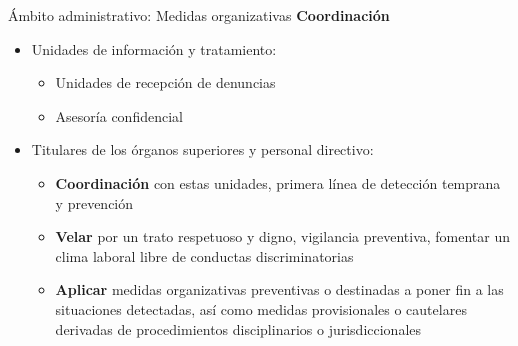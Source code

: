 \documentclass{beamer}
\begin{document}
    \begin{frame}{Ámbito administrativo: Medidas organizativas}
        \textbf{Coordinación}
        \begin{itemize}
            \item Unidades de información y tratamiento:
            \begin{itemize}
                \item Unidades de recepción de denuncias
                \item Asesoría confidencial
            \end{itemize}
            \item Titulares de los órganos superiores y personal directivo:
            \begin{itemize}
                \item \textbf{Coordinación} con estas unidades, primera línea de detección temprana y prevención
                \item \textbf{Velar} por un trato respetuoso y digno, vigilancia preventiva, fomentar un clima laboral libre de conductas discriminatorias
                \item \textbf{Aplicar} medidas organizativas preventivas o destinadas a poner fin a las situaciones detectadas, así como medidas provisionales o cautelares derivadas de procedimientos disciplinarios o jurisdiccionales
            \end{itemize}
        \end{itemize}
    \end{frame}
\end{document}
